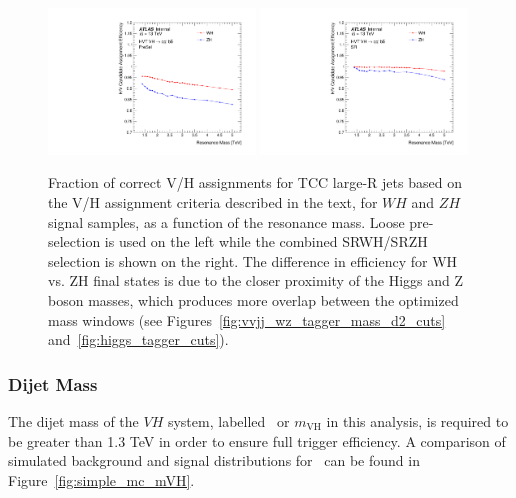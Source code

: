 \begin{figure}[htbp!]
\begin{center}
\includegraphics[width=0.49\textwidth]{VHqqbb_HVCandAssignEff_presel.pdf}
\includegraphics[width=0.49\textwidth]{VHqqbb_HVCandAssignEff_SR.pdf}
\end{center}
\caption{
Fraction of correct V/H assignments for TCC large-R jets based on the V/H assignment criteria described in the text, for $WH$ and $ZH$ signal samples, as a function of the resonance mass.
Loose pre-selection is used on the left while the combined SRWH/SRZH selection is shown on the right.
The difference in efficiency for WH vs. ZH final states is due to the closer proximity of the Higgs and Z boson masses, which produces more overlap between the optimized mass windows (see Figures~\ref{fig:vvjj_wz_tagger_mass_d2_cuts} and~\ref{fig:higgs_tagger_cuts}).
}
\label{fig:assignment}
\end{figure}

\subsubsection{Dijet Mass}
The dijet mass of the $VH$ system, labelled \mvh\ or $m_{\mathrm{VH}}$ in this analysis, is required to be greater than 1.3 TeV in order to ensure full trigger efficiency.
A comparison of simulated background and signal distributions for \mvh\ can be found in Figure~\ref{fig:simple_mc_mVH}.

